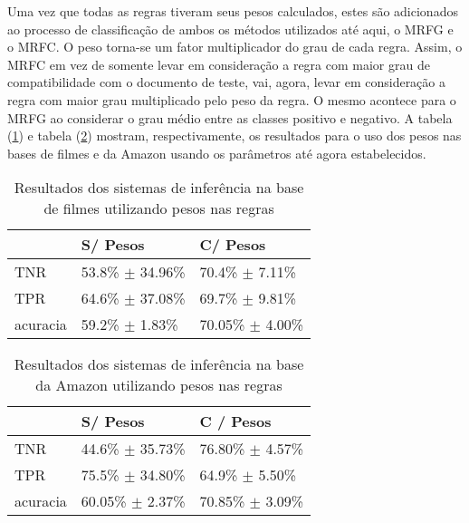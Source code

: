 \documentclass[template.tex]{subfiles}
\begin{document}
Uma vez que todas as regras tiveram seus pesos calculados, estes são adicionados ao processo de classificação de ambos os métodos utilizados até aqui, o MRFG e o MRFC. O peso torna-se um fator multiplicador do grau de cada regra. Assim, o MRFC em vez de somente levar em consideração a regra com maior grau de compatibilidade com o documento de teste, vai, agora, levar em consideração a regra com maior grau multiplicado pelo peso da regra. O mesmo acontece para o MRFG ao considerar o grau médio entre as classes positivo e negativo. A tabela (\ref{table:movies2_pesos}) e tabela (\ref{table:amazon2_pesos}) mostram, respectivamente, os resultados para o uso dos pesos nas bases de filmes e da Amazon usando os parâmetros até agora estabelecidos. 

\begin{table}[!h]
    \begin{tabular}{lll}
 	~         			& S/ Pesos 								& C/ Pesos \\ \hline
    TNR 				& 53.8\% $\pm$ 34.96\%   	& 70.4\% $\pm$ 7.11\%    \\
    TPR    			& 64.6\% $\pm$ 37.08\%   	& 69.7\% $\pm$ 9.81\%   \\   
    acuracia  		& 59.2\% $\pm$ 1.83\%    	& 70.05\% $\pm$ 4.00\%    \\
    \end{tabular}
    \caption{Resultados dos sistemas de inferência na base de filmes utilizando pesos nas regras}
	\label{table:movies2_pesos}
\end{table}

%
%
%

\begin{table}[!h]
    \begin{tabular}{lll}
    ~         			& S/ Pesos									& C / Pesos \\ \hline
    TNR 				& 44.6\% $\pm$ 35.73\%    	& 76.80\% $\pm$ 4.57\%    \\
    TPR    			& 75.5\% $\pm$ 34.80\%    	& 64.9\% $\pm$ 5.50\%    \\
    acuracia  		& 60.05\% $\pm$ 2.37\%    	& 70.85\% $\pm$ 3.09\%   \\
    \end{tabular}
    \caption{Resultados dos sistemas de inferência na base da Amazon utilizando pesos nas regras}
	\label{table:amazon2_pesos}
\end{table}
\end{document}
